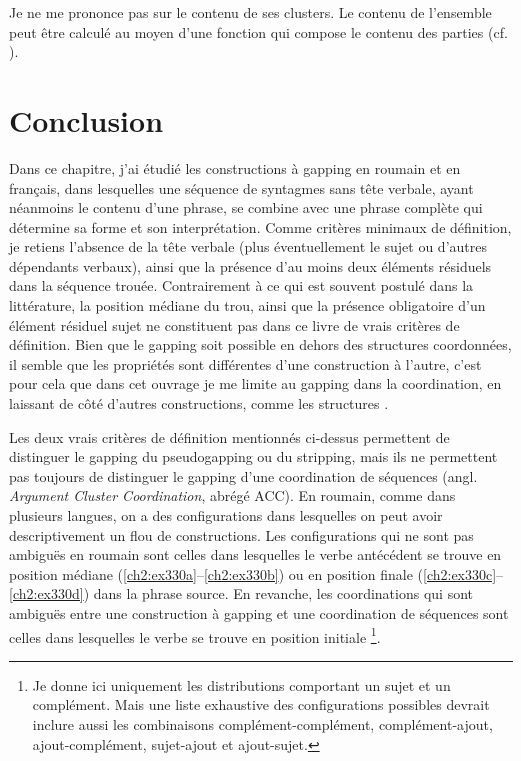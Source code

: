 Je ne me prononce pas sur le contenu de ses clusters. Le contenu de l’ensemble peut être calculé au moyen d’une fonction qui compose le contenu des parties (cf. \citealt{Steedman2000}).


\section{Conclusion}\label{ch2:sect2.7}
\setlength{\parindent}{\normalparindent}
Dans ce chapitre, j’ai étudié les constructions à gapping en roumain et en français, dans lesquelles une séquence de syntagmes sans tête verbale, ayant néanmoins le contenu d’une phrase, se combine avec une phrase complète qui détermine sa forme et son interprétation. Comme critères minimaux de définition, je retiens l’absence de la tête verbale (plus éventuellement le sujet ou d’autres dépendants verbaux), ainsi que la présence d’au moins deux éléments résiduels dans la séquence trouée. Contrairement à ce qui est souvent postulé dans la littérature, la position médiane du trou, ainsi que la présence obligatoire d’un élément résiduel sujet ne constituent pas dans ce livre de vrais critères de définition. Bien que le gapping soit possible en dehors des structures coordonnées, il semble que les propriétés sont différentes d’une construction à l’autre, c’est pour cela que dans cet ouvrage je me limite au gapping dans la coordination, en laissant de côté d’autres constructions, comme les structures .

Les deux vrais critères de définition mentionnés ci-dessus permettent de distinguer le gapping du pseudogapping ou du stripping, mais ils ne permettent pas toujours de distinguer le gapping d’une coordination de séquences (angl. \textit{Argument Cluster Coordination}, abrégé ACC). En roumain, comme dans plusieurs langues, on a des configurations dans lesquelles on peut avoir descriptivement un flou de constructions. Les configurations qui ne sont pas ambiguës en roumain sont celles dans lesquelles le verbe antécédent se trouve en position médiane (\ref{ch2:ex330a}--\ref{ch2:ex330b}) ou en position finale (\ref{ch2:ex330c}--\ref{ch2:ex330d}) dans la phrase source. En revanche, les coordinations qui sont ambiguës entre une construction à gapping et une coordination de séquences sont celles dans lesquelles le verbe se trouve en position initiale \footnote{Je donne ici uniquement les distributions comportant un sujet et un complément. Mais une liste exhaustive des configurations possibles devrait inclure aussi les combinaisons complément-complément, compl\-ément-ajout, ajout-complément, sujet-ajout et ajout-sujet.}.

